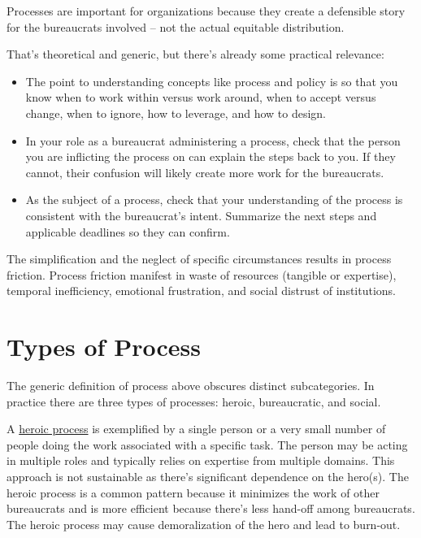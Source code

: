 Processes are important for organizations because they create a defensible story for the bureaucrats involved -- not the actual equitable distribution.

That's theoretical and generic, but there's already some practical relevance:
\begin{itemize}
\item The point to understanding concepts like process and policy is so that you know when to work within versus work around, when to accept versus change, when to ignore, how to leverage, and how to design.
    \item In your role as a bureaucrat administering a process, check that the person you are inflicting the process on can explain the steps back to you. If they cannot, their confusion will likely create more work for the bureaucrats. 
    \item As the subject of a process, check that your understanding of the process is consistent with the bureaucrat's intent. Summarize the next steps and applicable deadlines so they can confirm. 
\end{itemize}

The simplification and the neglect of specific circumstances results in process friction. Process friction manifest in waste of resources (tangible or expertise), temporal inefficiency, emotional frustration, and social distrust of institutions.



\section{Types of Process}
The generic definition of process above obscures distinct subcategories. In practice there are three types of processes: heroic, bureaucratic, and social.

A \underline{heroic process} is exemplified by a single person or a very small number of people doing the work associated with a specific task. The person may be acting in multiple roles and typically relies on expertise from multiple domains. This approach is not sustainable as there's significant dependence on the hero(s). The heroic process is a common pattern because it minimizes the work of other bureaucrats and is more efficient because there's less hand-off among bureaucrats. The heroic process may cause demoralization of the hero and lead to burn-out. 


